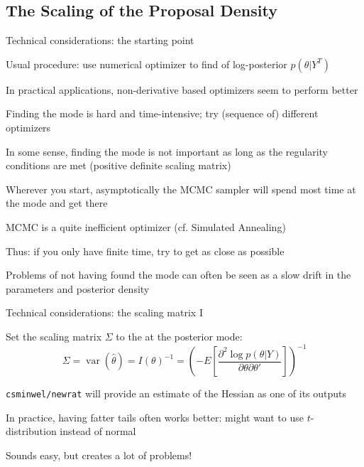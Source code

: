 \subsection{The Scaling of the Proposal Density}
\renewcommand{\Source}{}
\begin{frame}{Technical considerations: the starting point}
\begin{witemize}
    \item Usual procedure: use numerical optimizer to find  of log-posterior $p(\theta|Y^T)$
    \item In practical applications, non-derivative based optimizers seem to perform better
    \item Finding the mode is hard and time-intensive; try (sequence of) different optimizers
    \item In some sense, finding the mode is not important as long as the regularity conditions are met (positive definite scaling matrix)
    \item Wherever you start, asymptotically the MCMC sampler will spend most time at the mode and get there
    \item MCMC is a quite inefficient optimizer (cf. Simulated Annealing)
    \item Thus: if you only have finite time, try to get as close as possible
    \item Problems of not having found the mode can often be seen as a slow drift in the parameters and posterior density
\end{witemize}
\end{frame}

\begin{frame}{Technical considerations: the scaling matrix I}
\begin{witemize}
    \item Set the scaling matrix $\Sigma$ to the  at the posterior mode:
    \begin{equation}
    \Sigma=\operatorname{var} \left( {\hat \theta } \right) = I\left( \theta  \right)^{-1} = {\left( { - E\left[ {\frac{{{\partial ^2}\log p\left( {\theta |Y} \right)}}{{\partial \theta \partial \theta '}}} \right]} \right)^{ - 1}}
    \end{equation}
    \item \texttt{csminwel/newrat} will provide an estimate of the Hessian as one of its outputs
    \item In practice, having fatter tails often works better: might want to use $t$-distribution instead of normal
    \item Sounds easy, but creates a lot of problems!
\end{witemize}
\end{frame}


